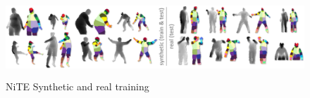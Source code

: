 \begin{figure}
	[h] \centering 
	\includegraphics[height=3cm]{figures/content/ni-train.png} \caption{NiTE Synthetic and real training} \label{fg:ni:train} 
\end{figure}
